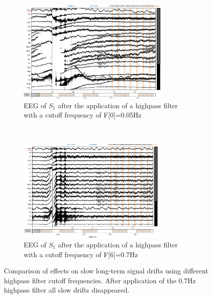 \documentclass[a4paper]{article}
\begin{document}
\begin{figure}[tbh!] 
\centering
 \begin{subfigure}[t]{0.5\textwidth}
        \centering
        \includegraphics[height=2.0in]{hp005.png}
\caption{EEG of $S_1$ after the application of a highpass filter with a cutoff frequency of F[0]=0.05Hz}
\end{subfigure}%
    ~ 
\begin{subfigure}[t]{0.5\textwidth}
        \centering
        \includegraphics[height=2.0in]{hp07.png}
        \caption{EEG of $S_1$ after the application of a highpass filter with a cutoff frequency of F[6]=0.7Hz}
\end{subfigure}
    \caption{Comparison of effects on slow long-term signal drifts using different highpass filter cutoff frequencies. After application of the 0.7Hz highpass filter all slow drifts disappeared.}
    \label{fig:filteringHighpassComparison}
\end{figure}
\end{document}

